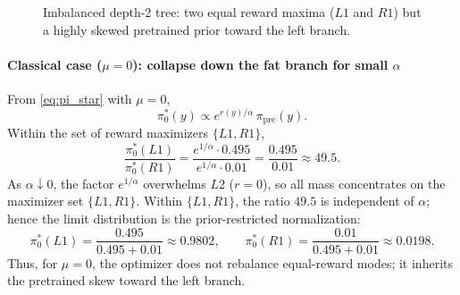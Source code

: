 \documentclass[11pt]{article}
\begin{document}
\begin{figure}[h]
\centering
{}
\caption{Imbalanced depth-2 tree: two equal reward maxima ($L1$ and $R1$) but a highly skewed pretrained prior toward the left branch.}
\label{fig:tree}
\end{figure}

\paragraph{Classical case ($\mu=0$): collapse down the fat branch for small $\alpha$}
From \eqref{eq:pi_star} with $\mu=0$,
\[
\pi^*_0(y)\propto e^{r(y)/\alpha}\,\pi_{\mathrm{pre}}(y).
\]
Within the set of reward maximizers $\{L1,R1\}$,
\[
\frac{\pi^*_0(L1)}{\pi^*_0(R1)}=
\frac{e^{1/\alpha}\cdot 0.495}{e^{1/\alpha}\cdot 0.01}=\frac{0.495}{0.01}\approx 49.5.
\]
As $\alpha\downarrow 0$, the factor $e^{1/\alpha}$ overwhelms $L2$ ($r=0$), so all mass concentrates on the maximizer set $\{L1,R1\}$. Within $\{L1,R1\}$, the ratio $49.5$ is independent of $\alpha$; hence the limit distribution is the prior-restricted normalization:
\[
\pi^*_0(L1)=\frac{0.495}{0.495+0.01}\approx 0.9802,\qquad
\pi^*_0(R1)=\frac{0.01}{0.495+0.01}\approx 0.0198.
\]
Thus, for $\mu=0$, the optimizer does not rebalance equal-reward modes; it inherits the pretrained skew toward the left branch.
\end{document}
